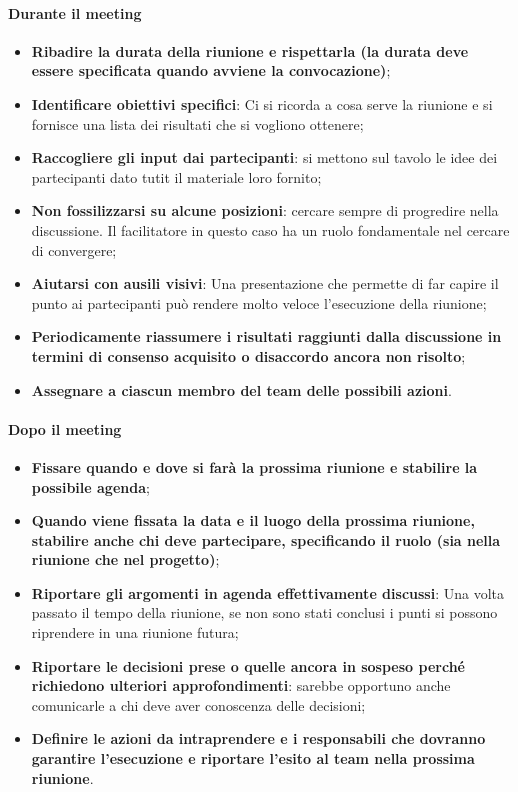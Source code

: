 \paragraph{Durante il meeting}
\begin{itemize}
	\item \textbf{Ribadire la durata della riunione e rispettarla (la durata deve essere specificata quando avviene la convocazione)};
	\item \textbf{Identificare obiettivi specifici}: Ci si ricorda a cosa serve la riunione e si fornisce una lista dei risultati che si vogliono ottenere;
	\item \textbf{Raccogliere gli input dai partecipanti}: si mettono sul tavolo le idee dei partecipanti dato tutit il materiale loro fornito;
	\item \textbf{Non fossilizzarsi su alcune posizioni}: cercare sempre di progredire nella discussione. Il facilitatore in questo caso ha un ruolo fondamentale nel cercare di convergere;
	\item \textbf{Aiutarsi con ausili visivi}: Una presentazione che permette di far capire il punto ai partecipanti può rendere molto veloce l'esecuzione della riunione;
	\item \textbf{Periodicamente riassumere i risultati raggiunti dalla discussione in termini di consenso acquisito o disaccordo ancora non risolto};
	\item \textbf{Assegnare a ciascun membro del team delle possibili azioni}.
\end{itemize}

\paragraph{Dopo il meeting}
\begin{itemize}
	\item \textbf{Fissare quando e dove si farà la prossima riunione e stabilire la possibile agenda};
	\item \textbf{Quando viene fissata la data e il luogo della prossima riunione, stabilire anche chi deve partecipare, specificando il ruolo (sia nella riunione che nel progetto)};
	\item \textbf{Riportare gli argomenti in agenda effettivamente discussi}: Una volta passato il tempo della riunione, se non sono stati conclusi i punti si possono riprendere in una riunione futura;
	\item \textbf{Riportare le decisioni prese o quelle ancora in sospeso perché richiedono ulteriori approfondimenti}: sarebbe opportuno anche comunicarle a chi deve aver conoscenza delle decisioni;
	\item \textbf{Definire le azioni da intraprendere e i responsabili che dovranno garantire l’esecuzione e riportare l’esito al team nella prossima riunione}.
\end{itemize}

